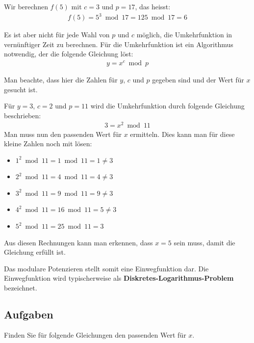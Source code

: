 \begin{example}
	Wir berechnen $f(5)$ mit $c = 3$ und $p = 17$, das heisst:
	\begin{align*}
		f(5) = 5^3 \bmod 17 = 125 \bmod 17 = 6
	\end{align*}
\end{example}

Es ist aber nicht für jede Wahl von $p$ und $c$ möglich, die Umkehrfunktion in vernünftiger Zeit zu berechnen. Für die Umkehrfunktion ist ein Algorithmus notwendig, der die folgende Gleichung löst:
\begin{align*}
y = x^c \bmod p
\end{align*}

Man beachte, dass hier die Zahlen für $y$, $c$ und $p$ gegeben sind und der Wert für $x$ gesucht ist.

\begin{example}
	Für $y = 3$, $c = 2$ und $p = 11$ wird die Umkehrfunktion durch folgende Gleichung beschrieben:
\begin{align*}
3 = x^2 \bmod 11
\end{align*}
	Man muss nun den passenden Wert für $x$ ermitteln. Dies kann man für diese kleine Zahlen noch mit  lösen:
\begin{multicols}{2}
\begin{itemize}
		\item $1^2 \bmod 11 = 1 \bmod 11 = 1 \neq 3$
		\item $2^2 \bmod 11 = 4 \bmod 11 = 4 \neq 3$
		\item $3^2 \bmod 11 = 9 \bmod 11 = 9 \neq 3$
		\item $4^2 \bmod 11 = 16 \bmod 11 = 5 \neq 3$
		\item $5^2 \bmod 11 = 25 \bmod 11 = 3$
\end{itemize}
\end{multicols}
	Aus diesen Rechnungen kann man erkennen, dass $x = 5$ sein muss, damit die Gleichung erfüllt ist.
\end{example}

Das modulare Potenzieren stellt somit eine Einwegfunktion dar. Die Einwegfunktion wird typischerweise als \textbf{Diskretes-Logarithmus-Problem} bezeichnet.

\subsection{Aufgaben}

Finden Sie für folgende Gleichungen den passenden Wert für $x$.

